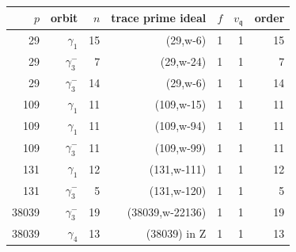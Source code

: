 \begin{tabular}{rrrrrrr}
\toprule
$p$ & orbit & $n$ & trace prime ideal & $f$ & $v_{\mathfrak q}$ & order \\
\midrule
29 & $\gamma_1$ & 15 & (29,w-6) & 1 & 1 & 15 \\
29 & $\gamma_3^{-}$ & 7 & (29,w-24) & 1 & 1 & 7 \\
29 & $\gamma_3^{-}$ & 14 & (29,w-6) & 1 & 1 & 14 \\
109 & $\gamma_1$ & 11 & (109,w-15) & 1 & 1 & 11 \\
109 & $\gamma_1$ & 11 & (109,w-94) & 1 & 1 & 11 \\
109 & $\gamma_3^{-}$ & 11 & (109,w-99) & 1 & 1 & 11 \\
131 & $\gamma_1$ & 12 & (131,w-111) & 1 & 1 & 12 \\
131 & $\gamma_3^{-}$ & 5 & (131,w-120) & 1 & 1 & 5 \\
38039 & $\gamma_3^{-}$ & 19 & (38039,w-22136) & 1 & 1 & 19 \\
38039 & $\gamma_4$ & 13 & (38039) in Z & 1 & 1 & 13 \\
\bottomrule
\end{tabular}
